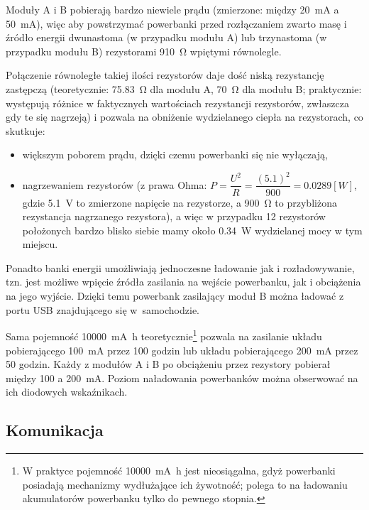 Moduły A i B pobierają bardzo niewiele prądu (zmierzone: między \SI{20}{\milli\ampere} a \SI{50}{\milli\ampere}), więc aby powstrzymać powerbanki przed rozłączaniem zwarto masę i źródło energii dwunastoma (w przypadku modułu A) lub trzynastoma (w przypadku modułu B) rezystorami \SI{910}{\ohm} wpiętymi równolegle.

Połączenie równoległe takiej ilości rezystorów daje dość niską rezystancję zastępczą (teoretycznie: \SI{75.83}{\ohm} dla modułu A, \SI{70}{\ohm} dla modułu B; praktycznie: występują różnice w faktycznych wartościach rezystancji rezystorów, zwłaszcza gdy te się nagrzeją) i pozwala na obniżenie wydzielanego ciepła na rezystorach, co skutkuje:

\begin{itemize}
\item większym poborem prądu, dzięki czemu powerbanki się nie wyłączają,
\item nagrzewaniem rezystorów (z prawa Ohma: $ P = \dfrac{U^2}{R} = \dfrac{(5.1)^2}{900} = 0.0289 [W] $, gdzie \SI{5.1}{\volt} to zmierzone napięcie na rezystorze, a \SI{900}{\ohm} to przybliżona rezystancja nagrzanego rezystora), a więc w przypadku 12 rezystorów położonych bardzo blisko siebie mamy około \SI{0.34}{\watt} wydzielanej mocy w tym miejscu.
\end{itemize}

Ponadto banki energii umożliwiają jednoczesne ładowanie jak i rozładowywanie, tzn. jest możliwe wpięcie źródła zasilania na wejście powerbanku, jak i obciążenia na jego wyjście. Dzięki temu powerbank zasilający moduł B można ładować z portu USB znajdującego się w~samochodzie.

Sama pojemność \SI{10000}{\milli\ampere\hour} teoretycznie\footnote{W praktyce pojemność \SI{10000}{\milli\ampere\hour} jest nieosiągalna, gdyż powerbanki posiadają mechanizmy wydłużające ich żywotność; polega to na ładowaniu akumulatorów powerbanku tylko do pewnego stopnia.} pozwala na zasilanie układu pobierającego \SI{100}{\milli\ampere} przez 100 godzin lub układu pobierającego \SI{200}{\milli\ampere} przez 50 godzin. Każdy z modułów A i B po obciążeniu przez rezystory pobierał między \num{100} a \SI{200}{\milli\ampere}. Poziom naładowania powerbanków można obserwować na ich diodowych wskaźnikach.

\subsection{Komunikacja}
\label{subsec:komunikacja}

